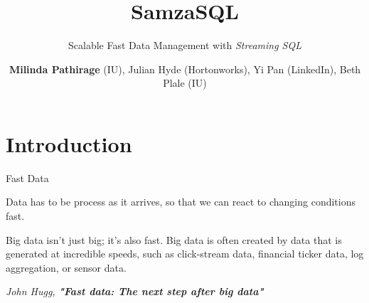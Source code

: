 \documentclass[newPxFont]{beamer}
\title{SamzaSQL}
\subtitle{Scalable Fast Data Management with \textit{Streaming SQL}}
\author{\textbf{Milinda Pathirage} (IU), Julian Hyde (Hortonworks), Yi Pan (LinkedIn), Beth Plale (IU)}
\institute{School of Informatics and Computing, Indiana University}
\begin{document}

%
%

\maketitle


%
%

\section*{Introduction}


\begin{frame}[c]{Fast Data}

Data has to be process as it arrives, so that we can react to changing conditions fast. 

\vspace{1em}

\begin{alertblock}{Big data isn't just big; it's also fast.}
Big data is often created by data that is generated at incredible speeds, such as click-stream data, financial ticker data, log aggregation, or sensor data. 
\end{alertblock}
\vspace{-1.5em}
\begin{flushright}
\tiny\textit{John Hugg, \textbf{"Fast data: The next step after big data"}}
\end{flushright}

\end{frame}

\end{document}
